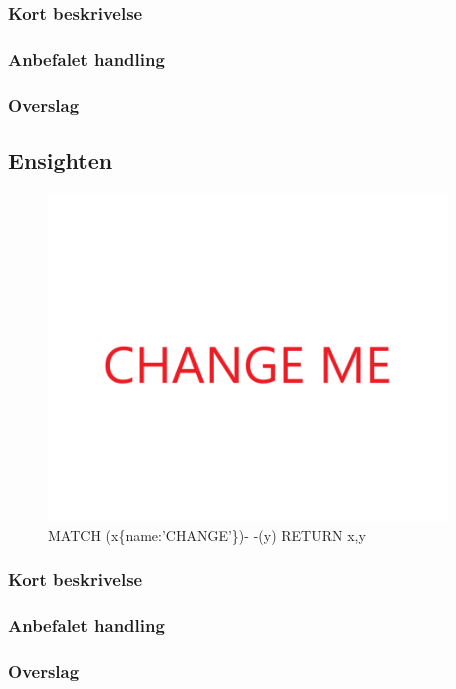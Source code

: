 \documentclass{article}
\begin{document}
\subsubsection{Kort beskrivelse}
\subsubsection{Anbefalet handling}
\subsubsection{Overslag}
\subsection{Ensighten}
\begin{figure}[h]
\includegraphics[width=300pt]{CHANGE.PNG}
\caption{MATCH (x\{name:'CHANGE'\})- -(y) RETURN x,y}
\end{figure}
\subsubsection{Kort beskrivelse}
\subsubsection{Anbefalet handling}
\subsubsection{Overslag}
\end{document}
